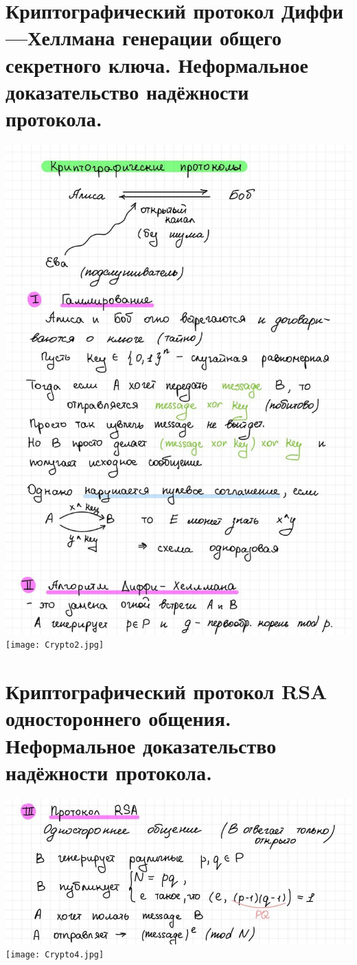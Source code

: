 \section{Криптографический протокол Диффи—Хеллмана генерации общего секретного ключа. Неформальное доказательство надёжности протокола.}

\includegraphics[width=1\linewidth]{images/Crypto1.jpg}
\newpage \texttt{[image: Crypto2.jpg]}

\section{Криптографический протокол RSA одностороннего общения. Неформальное доказательство надёжности протокола.}

\includegraphics[width=1\linewidth]{images/Crypto3.jpg}
\newline \texttt{[image: Crypto4.jpg]}

